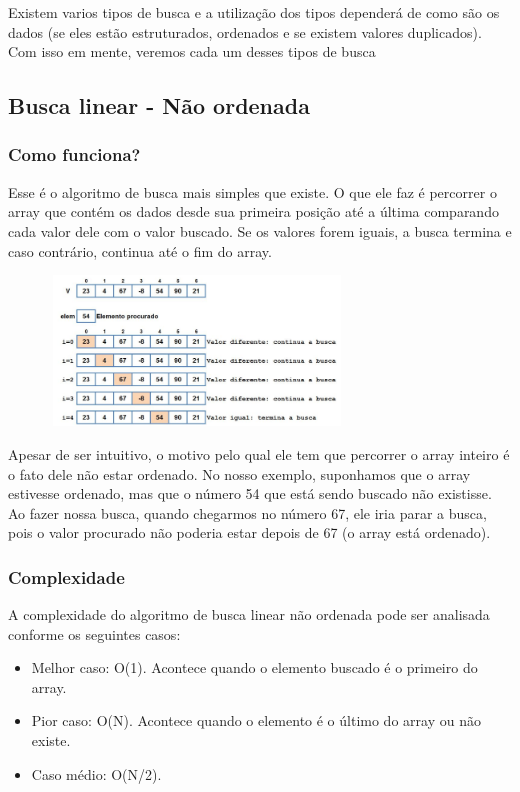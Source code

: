 \documentclass{report}
\begin{document}
	Existem varios tipos de busca e a utilização dos tipos dependerá de como são os dados (se eles estão estruturados, ordenados e se existem valores duplicados). Com isso em mente, veremos cada um desses tipos de busca
	\subsection{Busca linear - Não ordenada}
	
	\subsubsection{Como funciona?}
	
	Esse é o algoritmo de busca mais simples que existe. O que ele faz é percorrer o array que contém os dados desde sua primeira posição até a última comparando cada valor dele com o valor buscado. Se os valores forem iguais, a busca termina e caso contrário, continua até o fim do array.
	
	
	\begin{center}
		
		\includegraphics[width=10cm,height=4cm,keepaspectratio=false]{imagens/blinearfuncionamento.png}
		
	\end{center}
	
	Apesar de ser intuitivo, o motivo pelo qual ele tem que percorrer o array inteiro é o fato dele não estar ordenado. No nosso exemplo, suponhamos que o array estivesse ordenado, mas que o número 54 que está sendo buscado não existisse. Ao fazer nossa busca, quando chegarmos no número 67, ele iria parar a busca, pois o valor procurado não poderia estar depois de 67 (o array está ordenado).
	\subsubsection{Complexidade}
	
	A complexidade do algoritmo de busca linear não ordenada pode ser analisada conforme os seguintes casos:
	
	\begin{itemize}
		\item Melhor caso: O(1). Acontece quando o elemento buscado é o primeiro do array.
		\item Pior caso: O(N). Acontece quando o elemento é o último do array ou não existe.
		\item Caso médio: O(N/2). 
	\end{itemize}
	
\end{document}
